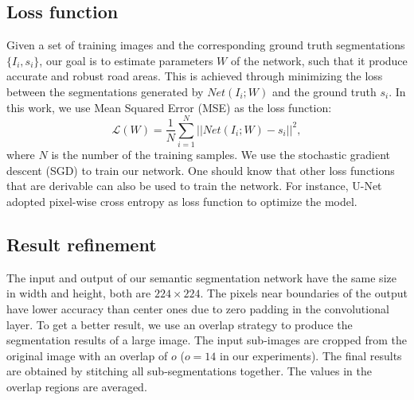 \documentclass[journal]{IEEEtran}
\begin{document}
\subsection{Loss function}
Given a set of training images and the corresponding ground truth segmentations $\{I_i,s_i\}$, our goal is to estimate parameters $W$ of the network, such that it produce accurate and robust road areas. This is achieved through minimizing the loss between the  segmentations generated by $Net(I_i;W)$ and the ground truth $s_i$. In this work, we use Mean Squared Error (MSE) as the loss function:
\begin{equation}\label{Equ:mse}
\mathcal{L}(W) = \frac{1}{N}\sum\limits^{N}_{i=1}||Net(I_i;W) - s_i||^2,
\end{equation}
where $N$ is the number of the training samples. We use the stochastic gradient descent (SGD) to train our network. One should know that other loss functions that are derivable can also be used to train the network. For instance, U-Net adopted pixel-wise cross entropy as loss function to optimize the model. 

\subsection{Result refinement}

The input and output of our semantic segmentation network have the same size in width and height, both are $224\times224$. The pixels near  boundaries of the output have lower accuracy than center ones due to zero padding in the convolutional layer. To get a better result, we use an overlap strategy to produce the segmentation results of a large image. The input sub-images are cropped from the original image with an overlap of $o$ ($o=14$ in our experiments). The final results are obtained by stitching all sub-segmentations together. The values in the overlap regions are averaged. 
\end{document}
